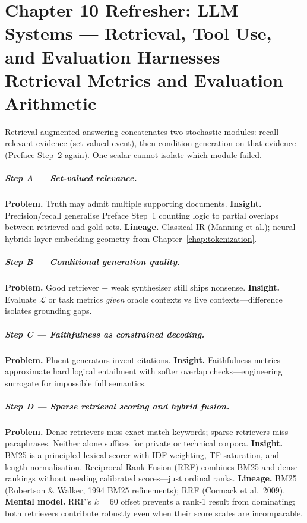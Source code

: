 \chapter{Chapter 10 Refresher: LLM Systems --- Retrieval, Tool Use, and Evaluation Harnesses --- Retrieval Metrics and Evaluation Arithmetic}
\label{chap:systems}

\scenelabel
Retrieval-augmented answering concatenates two stochastic modules: recall relevant evidence (set-valued event), then condition generation on that evidence (Preface Step~2 again). One scalar cannot isolate which module failed.

\paragraph{Step A --- Set-valued relevance.}
\textbf{Problem.} Truth may admit multiple supporting documents.
\textbf{Insight.} Precision/recall generalise Preface Step~1 counting logic to partial overlaps between retrieved and gold sets.
\textbf{Lineage.} Classical IR (Manning et al.); neural hybrids layer embedding geometry from Chapter~\ref{chap:tokenization}.

\paragraph{Step B --- Conditional generation quality.}
\textbf{Problem.} Good retriever + weak synthesiser still ships nonsense.
\textbf{Insight.} Evaluate \(\mathcal{L}\) or task metrics \emph{given} oracle contexts vs live contexts---difference isolates grounding gaps.

\paragraph{Step C --- Faithfulness as constrained decoding.}
\textbf{Problem.} Fluent generators invent citations.
\textbf{Insight.} Faithfulness metrics approximate hard logical entailment with softer overlap checks---engineering surrogate for impossible full semantics.

\paragraph{Step D --- Sparse retrieval scoring and hybrid fusion.}
\textbf{Problem.} Dense retrievers miss exact-match keywords; sparse retrievers miss paraphrases. Neither alone suffices for private or technical corpora.
\textbf{Insight.} BM25 is a principled lexical scorer with IDF weighting, TF saturation, and length normalisation. Reciprocal Rank Fusion (RRF) combines BM25 and dense rankings without needing calibrated scores---just ordinal ranks.
\textbf{Lineage.} BM25 (Robertson \& Walker, 1994 BM25 refinements); RRF (Cormack et al.\ 2009).
\textbf{Mental model.} RRF's $k=60$ offset prevents a rank-1 result from dominating; both retrievers contribute robustly even when their score scales are incomparable.

